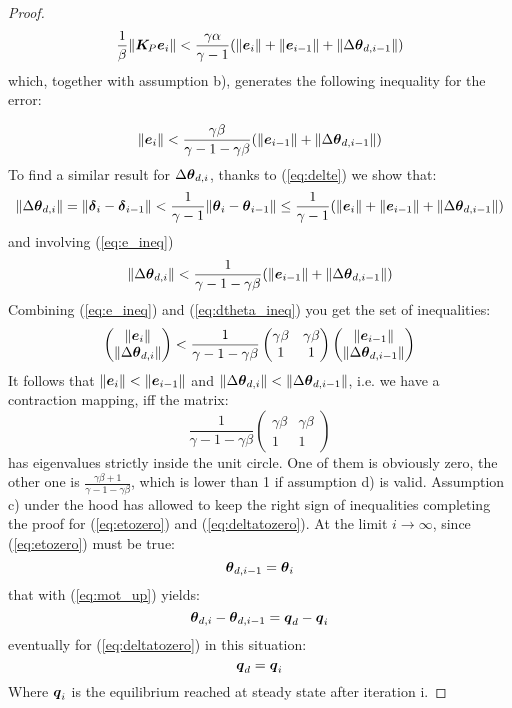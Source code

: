 \begin{proof}
\[
    \frac{1}{\beta} \|\boldsymbol{K}_{\!P} \boldsymbol{e}_i \| <  
    \frac{\gamma\alpha}{\gamma-1}(\|\boldsymbol{e}_i \|+ \|\boldsymbol{e}_{i-1}\| + \|\Delta\boldsymbol{\theta}_{d,i-1}\|)
\]
which, together with assumption b), generates the following inequality for the error: 

\begin{equation} \label{eq:e_ineq}
    \|\boldsymbol{e}_i\| < \frac{\gamma\beta}{\gamma-1-\gamma\beta}(\|\boldsymbol{e}_{i-1}\|+\|\Delta\boldsymbol{\theta}_{d,i-1}\|)
\end{equation}
To find a similar result for \(\Delta\boldsymbol{\theta}_{d,i}\), thanks to (\ref{eq:delte}) we show that:
\[
 \|\Delta\boldsymbol{\theta}_{d,i}\| = \|\boldsymbol{\delta}_i - \boldsymbol{\delta}_{i-1}\| < \frac{1}{\gamma-1}\|\boldsymbol{\theta}_i-\boldsymbol{\theta}_{i-1}\| \leq \frac{1}{\gamma-1}(\|\boldsymbol{e}_i \|+ \|\boldsymbol{e}_{i-1}\| + \|\Delta\boldsymbol{\theta}_{d,i-1}\|)
\]
and involving (\ref{eq:e_ineq})
\begin{equation} \label{eq:dtheta_ineq}
    \|\Delta\boldsymbol{\theta}_{d,i}\|  <\frac{1}{\gamma-1-\gamma\beta}(\|\boldsymbol{e}_{i-1}\|+\|\Delta\boldsymbol{\theta}_{d,i-1}\|)
\end{equation}
Combining (\ref{eq:e_ineq}) and (\ref{eq:dtheta_ineq}) you get the set of inequalities:
\begin{equation}
    \begin{pmatrix}\|\boldsymbol{e}_i\|\\ \|\Delta\boldsymbol{\theta}_{d,i}\|\end{pmatrix} < \frac{1}{\gamma-1-\gamma\beta}\begin{pmatrix}\gamma\beta & \gamma\beta \\ 1 & 1\end{pmatrix}\begin{pmatrix}\|\boldsymbol{e}_{i-1}\|\\ \|\Delta\boldsymbol{\theta}_{d,i-1}\|\end{pmatrix}
\end{equation}
It follows that \( \|\boldsymbol{e}_i\| < \|\boldsymbol{e}_{i-1}\| \) and \( \|\Delta\boldsymbol{\theta}_{d,i}\|<\|\Delta\boldsymbol{\theta}_{d,i-1}\|\), i.e. we have a contraction mapping, iff the matrix:
\[
    \frac{1}{\gamma-1-\gamma\beta}\begin{pmatrix}\gamma\beta & \gamma\beta \\ 1 & 1\end{pmatrix}
\]
has eigenvalues strictly inside the unit circle. One of them is obviously zero, the other one is \( \frac{\gamma\beta +1}{\gamma-1-\gamma\beta}\), which is lower than 1 if assumption d) is valid. Assumption c) under the hood has allowed to keep the right sign of inequalities completing the proof for (\ref{eq:etozero}) and (\ref{eq:deltatozero}). 
At the limit \(i\to\infty\), since (\ref{eq:etozero}) must be true:
\begin{equation*}
    \boldsymbol{\theta}_{d,i-1}=\boldsymbol{\theta}_i
\end{equation*}
that with (\ref{eq:mot_up}) yields:
\begin{equation*}
    \boldsymbol{\theta}_{d,i} - \boldsymbol{\theta}_{d,i-1} = {\boldsymbol{q}}_d - {\boldsymbol{q}}_i
\end{equation*}
eventually for (\ref{eq:deltatozero}) in this situation:
\begin{equation}
    {\boldsymbol{q}}_d = {\boldsymbol{q}}_i
\end{equation}
Where \({\boldsymbol{q}}_i\) is the equilibrium reached at steady state after iteration i. \end{proof}
